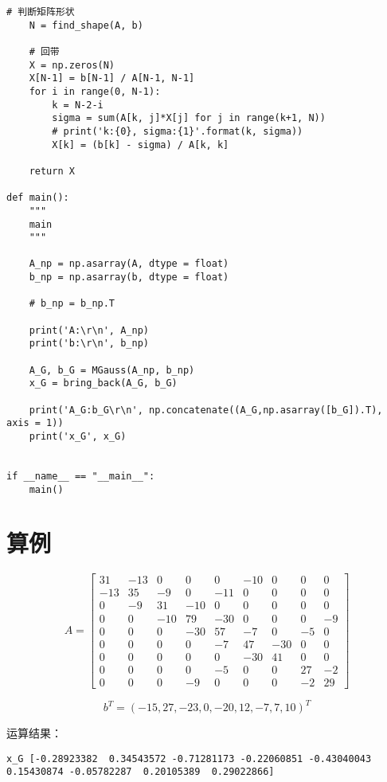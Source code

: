 \begin{lstlisting}[style = python]
    # 判断矩阵形状
    N = find_shape(A, b)

    # 回带
    X = np.zeros(N)
    X[N-1] = b[N-1] / A[N-1, N-1]
    for i in range(0, N-1):
        k = N-2-i
        sigma = sum(A[k, j]*X[j] for j in range(k+1, N))
        # print('k:{0}, sigma:{1}'.format(k, sigma))
        X[k] = (b[k] - sigma) / A[k, k]

    return X
        
def main():
    """
    main
    """

    A_np = np.asarray(A, dtype = float)
    b_np = np.asarray(b, dtype = float)

    # b_np = b_np.T

    print('A:\r\n', A_np)
    print('b:\r\n', b_np)

    A_G, b_G = MGauss(A_np, b_np)
    x_G = bring_back(A_G, b_G)

    print('A_G:b_G\r\n', np.concatenate((A_G,np.asarray([b_G]).T), axis = 1))
    print('x_G', x_G)


if __name__ == "__main__":
    main()
\end{lstlisting}

\section{算例}

$$
A = 
\begin{bmatrix}
31 & -13 & 0 & 0 & 0 & -10 & 0 & 0 & 0 \\
-13 & 35 & -9 & 0 & -11 & 0 & 0 & 0 & 0 \\
0 & -9 & 31 & -10 & 0 & 0 & 0 & 0 & 0 \\
0 & 0 & -10 & 79 & -30 & 0 & 0 & 0 & -9 \\
0 & 0 & 0 & -30 & 57 & -7 & 0 & -5 & 0 \\
0 & 0 & 0 & 0 & -7 & 47 & -30 & 0 & 0 \\
0 & 0 & 0 & 0 & 0 & -30 & 41 & 0 & 0 \\
0 & 0 & 0 & 0 & -5 & 0 & 0 & 27 & -2 \\
0 & 0 & 0 & -9 & 0 & 0 & 0 & -2 & 29
\end{bmatrix}
$$

$$
b^T = (-15, 27, -23, 0, -20, 12, -7, 7, 10)^T
$$

运算结果：

\begin{lstlisting}[style = python]
x_G [-0.28923382  0.34543572 -0.71281173 -0.22060851 -0.43040043  0.15430874 -0.05782287  0.20105389  0.29022866]
\end{lstlisting}

